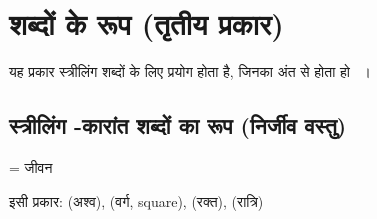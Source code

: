 \section{शब्दों के रूप (तृतीय प्रकार)}\label{sec:noun-endings-third-declension-female}
यह प्रकार स्त्रीलिंग शब्दों के लिए प्रयोग होता है, जिनका अंत  से होता हो ~\cite{readyruss2021,levine2009}।

\subsection{स्त्रीलिंग -कारांत शब्दों का रूप (निर्जीव वस्तु)}\label{subsec:noun-endings-second-declension-hard-inanimate-female}
 = जीवन

इसी प्रकार:  (अश्व),  (वर्ग, square),  (रक्त),  (रात्रि)
